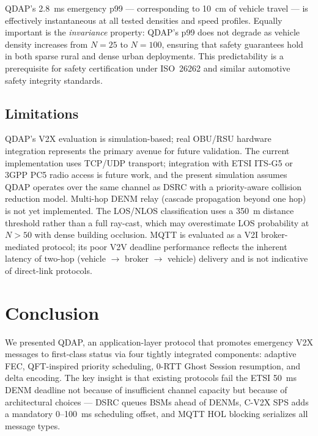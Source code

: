 \documentclass[journal]{IEEEtran}
\begin{document}
QDAP's \SI{2.8}{\milli\second} emergency p99 — corresponding to
\SI{10}{\centi\metre} of vehicle travel — is effectively instantaneous at
all tested densities and speed profiles.
Equally important is the \emph{invariance} property: QDAP's p99 does not
degrade as vehicle density increases from $N{=}25$ to $N{=}100$, ensuring
that safety guarantees hold in both sparse rural and dense urban deployments.
This predictability is a prerequisite for safety certification under ISO~26262
and similar automotive safety integrity standards.

\subsection{Limitations}

QDAP's V2X evaluation is simulation-based; real OBU/RSU hardware
integration represents the primary avenue for future validation.
The current implementation uses TCP/UDP transport; integration with
ETSI ITS-G5 or 3GPP PC5 radio access is future work, and the present
simulation assumes QDAP operates over the same channel as DSRC with a
priority-aware collision reduction model.
Multi-hop DENM relay (cascade propagation beyond one hop) is not yet
implemented.
The LOS/NLOS classification uses a \SI{350}{\metre} distance threshold
rather than a full ray-cast, which may overestimate LOS probability at
$N > 50$ with dense building occlusion.
MQTT is evaluated as a V2I broker-mediated protocol; its poor V2V deadline
performance reflects the inherent latency of two-hop (vehicle $\to$ broker
$\to$ vehicle) delivery and is not indicative of direct-link protocols.


\section{Conclusion}
\label{sec:conclusion}

We presented QDAP, an application-layer protocol that promotes emergency V2X
messages to first-class status via four tightly integrated components:
adaptive FEC, QFT-inspired priority scheduling, 0-RTT Ghost Session resumption,
and delta encoding.
The key insight is that existing protocols fail the ETSI \SI{50}{\milli\second}
DENM deadline not because of insufficient channel capacity but because of
architectural choices — DSRC queues BSMs ahead of DENMs, C-V2X SPS adds
a mandatory 0–100~ms scheduling offset, and MQTT HOL blocking serializes
all message types.
\end{document}

